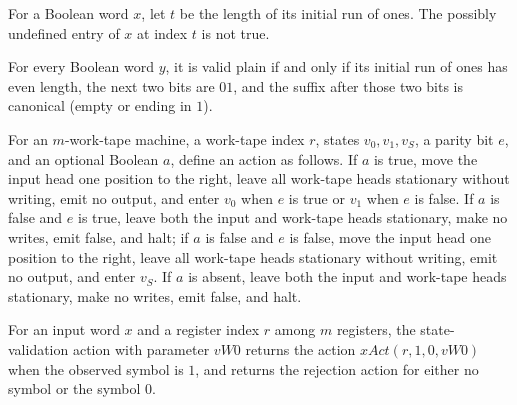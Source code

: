 \begin{lemma}
\leanok
{}
For a Boolean word $x$, let $t$ be the length of its initial run of ones. The possibly
undefined entry of $x$ at index $t$ is not true.
\end{lemma}

\begin{lemma}
\label{Complexity.LogProg.validPlain_iff}
\leanok
{}
For every Boolean word $y$, it is valid plain if and only if its initial run of ones has
even length, the next two bits are $01$, and the suffix after those two bits is
canonical (empty or ending in $1$).
\end{lemma}

\begin{definition}
\label{Complexity.LogProg.valUAct}
\leanok
{}
For an $m$-work-tape machine, a work-tape index $r$, states $v_0,v_1,v_S$, a parity bit
$e$, and an optional Boolean $a$, define an action as follows. If $a$ is true, move the
input head one position to the right, leave all work-tape heads stationary without
writing, emit no output, and enter $v_0$ when $e$ is true or $v_1$ when $e$ is false. If
$a$ is false and $e$ is true, leave both the input and work-tape heads stationary, make
no writes, emit false, and halt; if $a$ is false and $e$ is false, move the input head
one position to the right, leave all work-tape heads stationary without writing, emit no
output, and enter $v_S$. If $a$ is absent, leave both the input and work-tape heads
stationary, make no writes, emit false, and halt.
\end{definition}

\begin{definition}
\label{Complexity.LogProg.valSAct}
\leanok
{}
For an input word $x$ and a register index $r$ among $m$ registers, the state-validation
action with parameter $vW0$ returns the action $xAct(r,1,0,vW0)$ when the observed
symbol is $1$, and returns the rejection action for either no symbol or the symbol $0$.
\end{definition}

